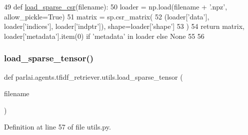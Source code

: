 \begin{DoxyCode}
49 \textcolor{keyword}{def }\hyperlink{namespaceparlai_1_1agents_1_1tfidf__retriever_1_1utils_ac866d85f1378528cb12c8d13b959d279}{load\_sparse\_csr}(filename):
50     loader = np.load(filename + \textcolor{stringliteral}{'.npz'}, allow\_pickle=\textcolor{keyword}{True})
51     matrix = sp.csr\_matrix(
52         (loader[\textcolor{stringliteral}{'data'}], loader[\textcolor{stringliteral}{'indices'}], loader[\textcolor{stringliteral}{'indptr'}]), shape=loader[\textcolor{stringliteral}{'shape'}]
53     )
54     \textcolor{keywordflow}{return} matrix, loader[\textcolor{stringliteral}{'metadata'}].item(0) \textcolor{keywordflow}{if} \textcolor{stringliteral}{'metadata'} \textcolor{keywordflow}{in} loader \textcolor{keywordflow}{else} \textcolor{keywordtype}{None}
55 
56 
\end{DoxyCode}
\mbox{\label{namespaceparlai_1_1agents_1_1tfidf__retriever_1_1utils_a28faf0af977db4915cf5253d69d37c0d}} 
\subsubsection{\texorpdfstring{load\+\_\+sparse\+\_\+tensor()}{load\_sparse\_tensor()}}
{\footnotesize\ttfamily def parlai.\+agents.\+tfidf\+\_\+retriever.\+utils.\+load\+\_\+sparse\+\_\+tensor (\begin{DoxyParamCaption}\item[{}]{filename }\end{DoxyParamCaption})}



Definition at line 57 of file utils.\+py.


